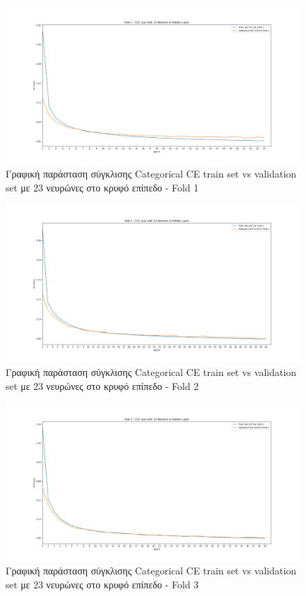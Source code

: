 \documentclass[12pt,a4paper]{article}
\begin{document}
\begin{figure}[H]
	\includegraphics[width=\textwidth]{Screenshots/19. Train vs Validation Fold 1.png}
	\caption{Γραφική παράσταση σύγκλισης Categorical CE train set vs validation set με 23 νευρώνες στο κρυφό επίπεδο - Fold 1}
\end{figure}

\begin{figure}[H]
	\includegraphics[width=\textwidth]{Screenshots/20. Train vs Validation Fold 2.png}
	\caption{Γραφική παράσταση σύγκλισης Categorical CE train set vs validation set με 23 νευρώνες στο κρυφό επίπεδο - Fold 2}
\end{figure}

\begin{figure}[H]
	\includegraphics[width=\textwidth]{Screenshots/21. Train vs Validation Fold 3.png}
	\caption{Γραφική παράσταση σύγκλισης Categorical CE train set vs validation set με 23 νευρώνες στο κρυφό επίπεδο - Fold 3}
\end{figure}
\end{document}
